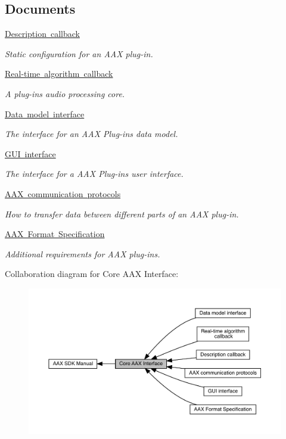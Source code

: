 \subsection*{Documents}
\begin{DoxyCompactItemize}
\item 
\mbox{\hyperlink{a00796}{Description callback}}
\begin{DoxyCompactList}\small\item\em Static configuration for an A\+AX plug-\/in. \end{DoxyCompactList}\item 
\mbox{\hyperlink{a00797}{Real-\/time algorithm callback}}
\begin{DoxyCompactList}\small\item\em A plug-\/in\textquotesingle{}s audio processing core. \end{DoxyCompactList}\item 
\mbox{\hyperlink{a00798}{Data model interface}}
\begin{DoxyCompactList}\small\item\em The interface for an A\+AX Plug-\/in\textquotesingle{}s data model. \end{DoxyCompactList}\item 
\mbox{\hyperlink{a00799}{G\+U\+I interface}}
\begin{DoxyCompactList}\small\item\em The interface for a A\+AX Plug-\/in\textquotesingle{}s user interface. \end{DoxyCompactList}\item 
\mbox{\hyperlink{a00800}{A\+A\+X communication protocols}}
\begin{DoxyCompactList}\small\item\em How to transfer data between different parts of an A\+AX plug-\/in. \end{DoxyCompactList}\item 
\mbox{\hyperlink{a00801}{A\+A\+X Format Specification}}
\begin{DoxyCompactList}\small\item\em Additional requirements for A\+AX plug-\/ins. \end{DoxyCompactList}\end{DoxyCompactItemize}
Collaboration diagram for Core A\+AX Interface\+:
\nopagebreak
\begin{figure}[H]
\begin{center}
\leavevmode
\includegraphics[width=350pt]{a00795}
\end{center}
\end{figure}
